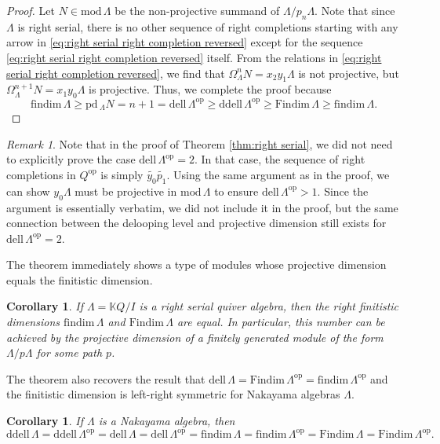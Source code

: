 \documentclass{conm-p-l}
\newcommand{\findim}{\mathrm{findim}\,}
\newcommand{\Findim}{\mathrm{Findim}\,}
\newcommand{\dell}{\mathrm{dell}\,}
\renewcommand{\dell}{\mathrm{dell}\,}
\newcommand{\pd}{\mathrm{pd}\,}
\newcommand{\op}{\mathrm{op}}
\renewcommand{\k}{\mathbb{K}}
\renewcommand{\mod}{\mathrm{mod}\,}
\newcommand{\ddell}{\mathrm{ddell}\,}
\newtheorem{corollary}[theorem]{Corollary}
\theoremstyle{definition}
\theoremstyle{remark}
\newtheorem{remark}[theorem]{Remark}
\numberwithin{equation}{section}
\begin{document}
\begin{proof}
Let $N\in\mod\Lambda$ be the non-projective summand of $\Lambda/p_n\Lambda$. Note that since $\Lambda$ is right serial, there is no other sequence of right completions starting with any arrow in \eqref{eq:right serial right completion reversed} except for the sequence \eqref{eq:right serial right completion reversed} itself. From the relations in \eqref{eq:right serial right completion reversed}, we find that $\Omega_{\Lambda}^n N = x_2y_1\Lambda$ is not projective, but $\Omega_{\Lambda}^{n+1} N= x_1y_0\Lambda$ is projective. Thus, we complete the proof because
\[
\findim\Lambda \geq \pd\!_{\Lambda} N = n+1 = \dell\Lambda^{\op}\geq\ddell\Lambda^{\op}\geq\Findim\Lambda\geq\findim\Lambda.
\]
\end{proof}

\begin{remark}
\label{rmk:dell=2 case}
Note that in the proof of Theorem \ref{thm:right serial}, we did not need to explicitly prove the case $\dell\Lambda^{\op}=2$. In that case, the sequence of right completions in $Q^{\op}$ is simply $\widetilde{y_0}\widetilde{p_1}$. Using the same argument as in the proof, we can show $y_0\Lambda$ must be projective in $\mod\Lambda$ to ensure $\dell\Lambda^{\op} > 1$. Since the argument is essentially verbatim, we did not include it in the proof, but the same connection between the delooping level and projective dimension still exists for $\dell\Lambda^{\op}=2$.
\end{remark}

The theorem immediately shows a type of modules whose projective dimension equals the finitistic dimension.

\begin{corollary}
If $\Lambda=\k Q/I$ is a right serial quiver algebra, then the right finitistic dimensions $\findim\Lambda$ and $\Findim\Lambda$ are equal. In particular, this number can be achieved by the projective dimension of a finitely generated module of the form $\Lambda/p\Lambda$ for some path $p$.
\end{corollary}

The theorem also recovers the result that $\dell\Lambda=\Findim\Lambda^{\op}=\findim\Lambda^{\op}$ and the finitistic dimension is left-right symmetric for Nakayama algebras $\Lambda$.

\begin{corollary}
If $\Lambda$ is a Nakayama algebra, then
\[
\ddell\Lambda=\ddell\Lambda^{\op}=\dell\Lambda=\dell\Lambda^{\op}=\findim\Lambda=\findim\Lambda^{\op}=\Findim\Lambda=\Findim\Lambda^{\op}.
\]
\end{corollary}
\end{document}
